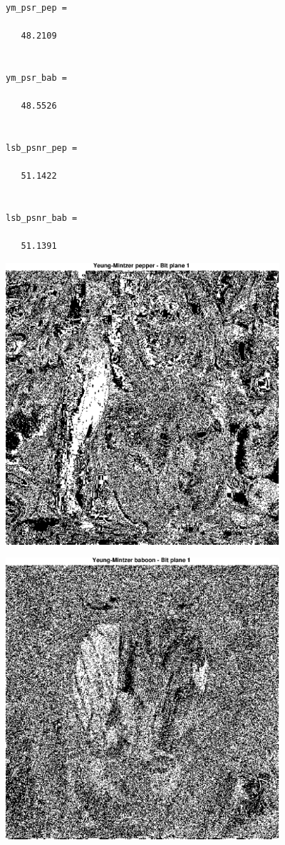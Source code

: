 \documentclass{article}
\begin{document}
        \color{lightgray} \begin{verbatim}
ym_psr_pep =

   48.2109


ym_psr_bab =

   48.5526


lsb_psnr_pep =

   51.1422


lsb_psnr_bab =

   51.1391

\end{verbatim} \color{black}
    
\includegraphics [width=4in]{lab3_05.eps}

\includegraphics [width=4in]{lab3_06.eps}
\end{document}
